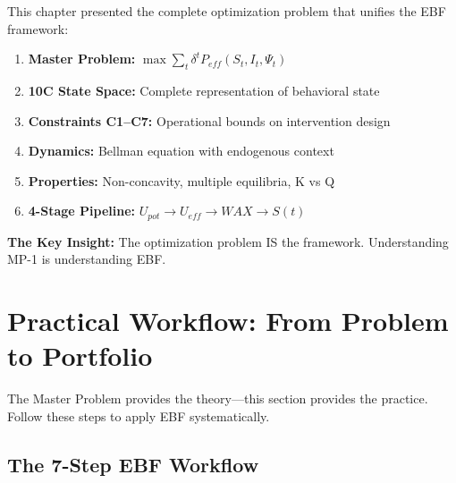 This chapter presented the complete optimization problem that unifies the EBF framework:

\begin{enumerate}
    \item \textbf{Master Problem:} $\max \sum_t \delta^t P_{eff}(S_t, I_t, \Psi_t)$
    \item \textbf{10C State Space:} Complete representation of behavioral state
    \item \textbf{Constraints C1--C7:} Operational bounds on intervention design
    \item \textbf{Dynamics:} Bellman equation with endogenous context
    \item \textbf{Properties:} Non-concavity, multiple equilibria, K vs Q
    \item \textbf{4-Stage Pipeline:} $U_{pot} \to U_{eff} \to WAX \to S(t)$
\end{enumerate}

\textbf{The Key Insight:} The optimization problem IS the framework. Understanding MP-1 is understanding EBF.


\section{Practical Workflow: From Problem to Portfolio}
\label{sec:25-workflow}

The Master Problem provides the theory---this section provides the practice. Follow these steps to apply EBF systematically.

\subsection{The 7-Step EBF Workflow}
\label{sec:25-7step}


